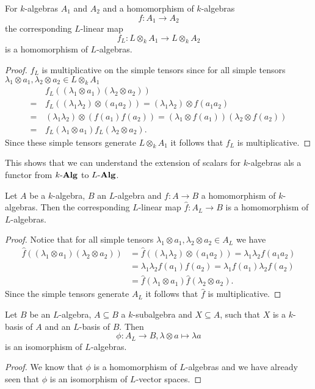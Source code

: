 \begin{lem}
 For $k$-algebras $A_1$ and $A_2$ and a homomorphism of $k$-algebras
 \[
  f \colon A_1 \to A_2
 \]
 the corresponding $L$-linear map
 \[
  f_L \colon L \otimes_k A_1 \to L \otimes_k A_2
 \]
 is a homomorphism of $L$-algebras.
\end{lem}
\begin{proof}
 $f_L$ is multiplicative on the simple tensors since for all simple tensors $\lambda_1 \otimes a_1, \lambda_2 \otimes a_2 \in L \otimes_k A_1$
 \begin{align*}
   &\, f_L((\lambda_1 \otimes a_1)(\lambda_2 \otimes a_2)) \\
  =&\, f_L((\lambda_1 \lambda_2) \otimes (a_1 a_2))
  =    (\lambda_1 \lambda_2) \otimes f(a_1 a_2) \\
  =&\, (\lambda_1 \lambda_2) \otimes (f(a_1)f(a_2))
  =    (\lambda_1 \otimes f(a_1)) (\lambda_2 \otimes f(a_2)) \\
  =&\, f_L(\lambda_1 \otimes a_1) f_L(\lambda_2 \otimes a_2).
 \end{align*}
 Since these simple tensors generate $L \otimes_k A_1$ it follows that $f_L$ is multiplicative.
\end{proof}
 
This shows that we can understand the extension of scalars for $k$-algebras als a functor from $k\text{-}\mathbf{Alg}$ to $L\text{-}\mathbf{Alg}$.

\begin{lem}
 Let $A$ be a $k$-algebra, $B$ an $L$-algebra and $f \colon A \to B$ a homomorphism of $k$-algebras. Then the corresponding $L$-linear map $\hat{f} \colon A_L \to B$ is a homomorphism of $L$-algebras.
 \begin{proof}
 Notice that for all simple tensors $\lambda_1 \otimes a_1, \lambda_2 \otimes a_2 \in A_L$ we have
  \begin{align*}
   \hat{f}((\lambda_1 \otimes a_1)(\lambda_2 \otimes a_2))
   &= \hat{f}((\lambda_1 \lambda_2) \otimes (a_1 a_2))
   = \lambda_1 \lambda_2 f(a_1 a_2) \\
   &= \lambda_1 \lambda_2 f(a_1) f(a_2)
   = \lambda_1 f(a_1) \lambda_2 f(a_2) \\
   &= \hat{f}(\lambda_1 \otimes a_1) \hat{f}(\lambda_2 \otimes a_2).
  \end{align*}
  Since the simple tensors generate $A_L$ it follows that $\hat{f}$ is multiplicative.
 \end{proof}
\end{lem}


\begin{cor}\label{cor: inclusion to bijection algebras}
 Let $B$ be an $L$-algebra, $A \subseteq B$ a $k$-subalgebra and $X \subseteq A$, such that $X$ is a $k$-basis of $A$ and an $L$-basis of $B$. Then
 \[
  \phi \colon A_L \to B, \lambda \otimes a \mapsto \lambda a
 \]
 is an isomorphism of $L$-algebras.
\end{cor}
\begin{proof}
 We know that $\phi$ is a homomorphism of $L$-algebras and we have already seen that $\phi$ is an isomorphism of $L$-vector spaces.
\end{proof}


